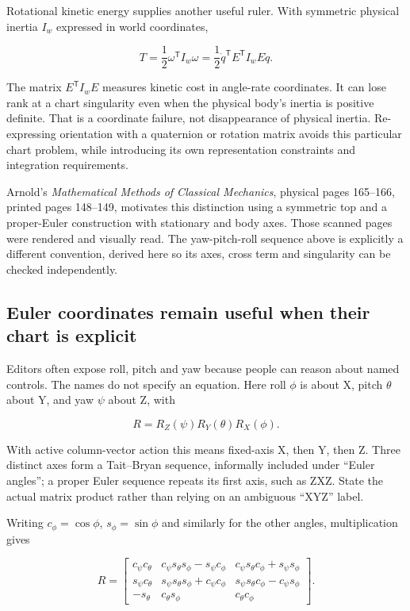 Rotational kinetic energy supplies another useful ruler. With symmetric physical inertia \(I_w\) expressed in world coordinates,

\[
T=\frac12\omega^{\mathsf T}I_w\omega
=\frac12\dot q^{\mathsf T}E^{\mathsf T}I_wE\dot q.
\]

The matrix \(E^{\mathsf T}I_wE\) measures kinetic cost in angle-rate coordinates. It can lose rank at a chart singularity even when the physical body's inertia is positive definite. That is a coordinate failure, not disappearance of physical inertia. Re-expressing orientation with a quaternion or rotation matrix avoids this particular chart problem, while introducing its own representation constraints and integration requirements.

Arnold's \emph{Mathematical Methods of Classical Mechanics}, physical pages 165--166, printed pages 148--149, motivates this distinction using a symmetric top and a proper-Euler construction with stationary and body axes. Those scanned pages were rendered and visually read. The yaw-pitch-roll sequence above is explicitly a different convention, derived here so its axes, cross term and singularity can be checked independently.

\subsection{Euler coordinates remain useful when their chart is explicit}\label{euler-coordinates-remain-useful-when-their-chart-is-explicit}

Editors often expose roll, pitch and yaw because people can reason about named controls. The names do not specify an equation. Here roll \(\phi\) is about X, pitch \(\theta\) about Y, and yaw \(\psi\) about Z, with

\[
R=R_Z(\psi)R_Y(\theta)R_X(\phi).
\]

With active column-vector action this means fixed-axis X, then Y, then Z. Three distinct axes form a Tait--Bryan sequence, informally included under ``Euler angles''; a proper Euler sequence repeats its first axis, such as ZXZ. State the actual matrix product rather than relying on an ambiguous ``XYZ'' label.

Writing \(c_\phi=\cos\phi\), \(s_\phi=\sin\phi\) and similarly for the other angles, multiplication gives

\[
R=\begin{bmatrix}
c_\psi c_\theta&c_\psi s_\theta s_\phi-s_\psi c_\phi&c_\psi s_\theta c_\phi+s_\psi s_\phi\\
s_\psi c_\theta&s_\psi s_\theta s_\phi+c_\psi c_\phi&s_\psi s_\theta c_\phi-c_\psi s_\phi\\
-s_\theta&c_\theta s_\phi&c_\theta c_\phi
\end{bmatrix}.
\]

